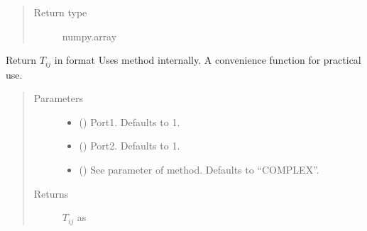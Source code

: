 \documentclass[letterpaper,10pt,english]{sphinxmanual}
\begin{document}
\begin{fulllineitems}
\begin{fulllineitems}
\begin{quote}
\begin{description}
\item[{Return type}] \leavevmode
numpy.array

\end{description}\end{quote}

\end{fulllineitems}


\begin{fulllineitems}
\label{\detokenize{touchstone:touchstone.spfile.T}}
Return \(T_{i j}\) in format 
Uses  method internally. A convenience function for practical use.
\begin{quote}\begin{description}
\item[{Parameters}] \leavevmode\begin{itemize}
\item {} 
 (\sphinxstyleliteralemphasis{\sphinxupquote{, }}) \textendash{} Port\sphinxhyphen{}1. Defaults to 1.

\item {} 
 (\sphinxstyleliteralemphasis{\sphinxupquote{, }}) \textendash{} Port\sphinxhyphen{}2. Defaults to 1.

\item {} 
 (\sphinxstyleliteralemphasis{\sphinxupquote{, }}) \textendash{} See  parameter of  method. Defaults to “COMPLEX”.

\end{itemize}

\item[{Returns}] \leavevmode
\(T_{i j}\) as 


\end{description}
\end{quote}
\end{fulllineitems}
\end{fulllineitems}
\end{document}

